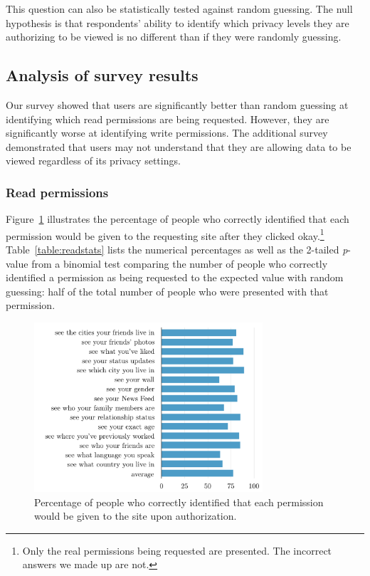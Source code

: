 \documentclass[10pt]{sig-alternate-10pt}
\begin{document}
This question can also be statistically tested against random guessing. The null hypothesis is that respondents' ability to identify which privacy levels they are authorizing to be viewed is no different than if they were randomly guessing.

\subsection{Analysis of survey results}

Our survey showed that users are significantly better than random guessing at identifying which read permissions are being requested. However, they are significantly worse at identifying write permissions. The additional survey demonstrated that users may not understand that they are allowing data to be viewed regardless of its privacy settings.

\subsubsection{Read permissions}

Figure~\ref{figure:readpercents} illustrates the percentage of people who correctly identified that each permission would be given to the requesting site after they clicked okay.\footnote{Only the real permissions being requested are presented. The incorrect answers we made up are not.} Table~\ref{table:readstats} lists the numerical percentages as well as the 2-tailed \emph{p}-value from a binomial test comparing the number of people who correctly identified a permission as being requested to the expected value with random guessing: half of the total number of people who were presented with that permission.

\begin{figure}[h!]
  \centering
  \includegraphics[width=8.5cm]{read_percents_cosn}
  \caption{Percentage of people who correctly identified that each permission would be given to the site upon authorization.}
  \label{figure:readpercents}
\end{figure}
\end{document}
